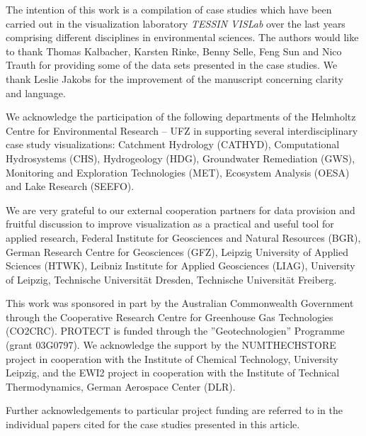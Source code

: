 \documentclass[twocolumn]{svjour3}          %
\begin{document}
\begin{acknowledgements}
The intention of this work is a compilation of case studies which have been carried out in the visualization laboratory \emph{TESSIN VISLab} over the last years comprising different disciplines in environmental sciences. The authors would like to thank Thomas Kalbacher, Karsten Rinke, Benny Selle, Feng Sun and Nico Trauth for providing some of the data sets presented in the case studies. We thank Leslie Jakobs for the improvement of the manuscript concerning clarity and language.

We acknowledge the participation of the following departments of the Helmholtz Centre for Environmental Research -- UFZ in supporting several interdisciplinary case study visualizations: Catchment Hydrology (CATHYD), Computational Hydrosystems (CHS), Hydrogeology (HDG), Groundwater Remediation (GWS), Monitoring and Exploration Technologies (MET), Ecosystem Analysis (OESA) and Lake Research (SEEFO).

We are very grateful to our external cooperation partners for data provision and fruitful discussion to improve visualization as a practical and useful tool for applied research, Federal Institute for Geosciences and Natural Resources (BGR), German Research Centre for Geosciences (GFZ), Leipzig University of Applied Sciences (HTWK), Leibniz Institute for Applied Geosciences (LIAG), University of Leipzig, Technische Universit\"at Dresden, Technische Universit\"at Freiberg.

This work was sponsored in part by the Australian Commonwealth Government through the Cooperative Research Centre for Greenhouse Gas Technologies (CO2CRC). PROTECT is fun\-ded through the ''Geotechnologien'' Programme (grant 03G0797). We acknowledge the support by the NUM\-THECHSTORE project in cooperation with the Institute of Chemical Technology, University Leipzig, and the EWI2 project in cooperation with the Institute of Technical Thermodynamics, German Aerospace Center (DLR).


Further acknowledgements to particular project funding are referred to in the individual papers cited for the case studies presented in this article.
\end{acknowledgements}

\end{document}
